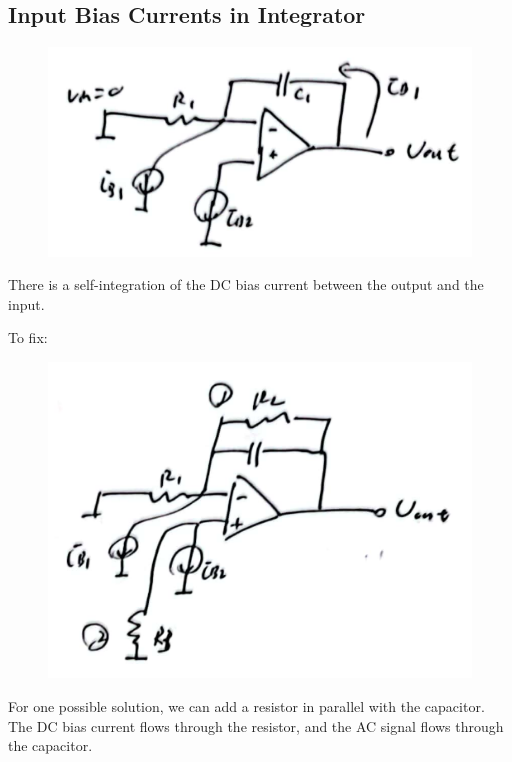 \documentclass[fontset=windows]{article}
\begin{document}
\subsection*{Input Bias Currents in Integrator}

\begin{figure}[htbp]
    \centering
    \includegraphics[scale=0.6]{15.jpg}
    \captionsetup{labelformat=empty}
    \caption{}
    \label{15}
\end{figure}

There is a self-integration of the DC bias current between the output and the input. 

To fix: 

\begin{figure}[htbp]
    \centering
    \includegraphics[scale=0.8]{16.jpg}
    \captionsetup{labelformat=empty}
    \caption{}
    \label{16}
\end{figure}

For one possible solution, we can add a resistor in parallel with the capacitor. The DC bias current flows through the resistor, and the AC signal flows through the capacitor. 
\end{document}
